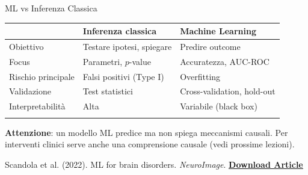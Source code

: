 \documentclass[
  ignorenonframetext,
]{beamer}
\begin{document}
\begin{frame}{ML vs Inferenza Classica}
\label{ml-vs-inferenza-classica}
\small

\begin{longtable}[]{@{}
  >{\raggedright\arraybackslash}p{}
  >{\raggedright\arraybackslash}p{}
  >{\raggedright\arraybackslash}p{}@{}}
\toprule\noalign{}
\begin{minipage}[b]{\linewidth}\raggedright
\end{minipage} & \begin{minipage}[b]{\linewidth}\raggedright
\textbf{Inferenza classica}
\end{minipage} & \begin{minipage}[b]{\linewidth}\raggedright
\textbf{Machine Learning}
\end{minipage} \\
\midrule\noalign{}
\endhead
\footnotesize Obiettivo & \footnotesize Testare ipotesi, spiegare &
\footnotesize Predire outcome \\
\footnotesize Focus & \footnotesize Parametri, \(p\)-value &
\footnotesize Accuratezza, AUC-ROC \\
\footnotesize Rischio principale & \footnotesize Falsi positivi (Type I)
& \footnotesize Overfitting \\
\footnotesize Validazione & \footnotesize Test statistici &
\footnotesize Cross-validation, hold-out \\
\footnotesize Interpretabilità & \footnotesize Alta &
\footnotesize Variabile (black box) \\
\bottomrule\noalign{}
\end{longtable}

\vspace{0.4em} \small \textbf{Attenzione}: un modello ML predice ma non
spiega meccanismi causali. Per interventi clinici serve anche una
comprensione causale (vedi prossime lezioni).

\vspace{0.2em}
\tiny Scandola et al. (2022). ML for brain disorders. \emph{NeuroImage}. \href{https://bpspsychub.onlinelibrary.wiley.com/doi/full/10.1111/jnp.70009}{\underline{\textbf{Download Article}}}
\end{frame}
\end{document}

